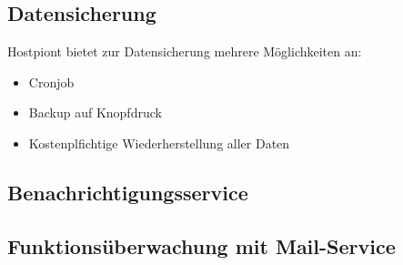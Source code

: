  


\subsection{Datensicherung}
Hostpiont bietet zur Datensicherung mehrere Möglichkeiten an:
\begin{itemize}
\item Cronjob
\item Backup auf Knopfdruck
\item Kostenplfichtige Wiederherstellung aller Daten
\end{itemize}








\subsection{Benachrichtigungsservice}

\subsection{Funktionsüberwachung mit Mail-Service}

